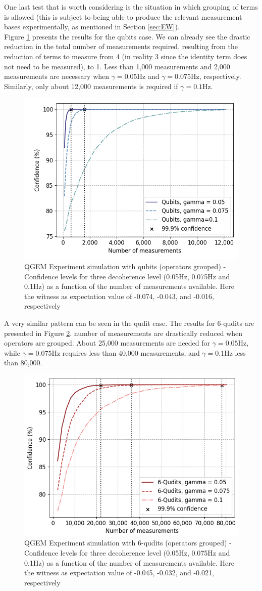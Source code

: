 \documentclass[%
 12pt,
 superscriptaddress,
 amsmath,
 amssymb,
 onecolumn,
 longbibliography
]{revtex4-2}
\begin{document}
\indent One last test that is worth considering is the situation in which grouping of terms is allowed (this is subject to being able to produce the relevant measurement bases experimentally, as mentioned in Section \ref{sec:EW}). \\
\indent Figure \ref{fig:expsim_qubits_grouped} presents the results for the qubits case. We can already see the drastic reduction in the total number of measurements required, resulting from the reduction of terms to measure from 4 (in reality 3 since the identity term does not need to be measured), to 1. Less than 1,000 measurements and 2,000 measurements are necessary when $\gamma = 0.05$Hz and $\gamma = 0.075$Hz, respectively. Similarly, only about 12,000 measurements is required if $\gamma = 0.1$Hz.\\
	\begin{figure}
    		\includegraphics[width=.5\columnwidth]{EW_confidence_qubits_deco_grouped.png}\par\medskip
	    \caption{QGEM Experiment simulation with qubits (operators grouped) - Confidence levels for three decoherence level (0.05Hz, 0.075Hz and 0.1Hz) as a function of the number of measurements available. Here the witness as expectation value of -0.074, -0.043, and -0.016, respectively} \label{fig:expsim_qubits_grouped}
	\end{figure} 
\indent A very similar pattern can be seen in the qudit case. The results for 6-qudits are presented in Figure \ref{fig:expsim_6qudits_grouped}. number of measurements are drastically reduced when operators are grouped. About 25,000 measurements are needed for $\gamma = 0.05$Hz, while $\gamma = 0.075$Hz requires less than 40,000 measurements, and $\gamma = 0.1$Hz less than 80,000.
	\begin{figure}
    	\includegraphics[width=.5\columnwidth]{EW_confidence_6qudits_grouped.png}\par\medskip
	    \caption{QGEM Experiment simulation with 6-qudits (operators grouped) - Confidence levels for three decoherence level (0.05Hz, 0.075Hz and 0.1Hz) as a function of the number of measurements available. Here the witness as expectation value of -0.045, -0.032, and -0.021, respectively} \label{fig:expsim_6qudits_grouped}
	\end{figure} 
\end{document}
